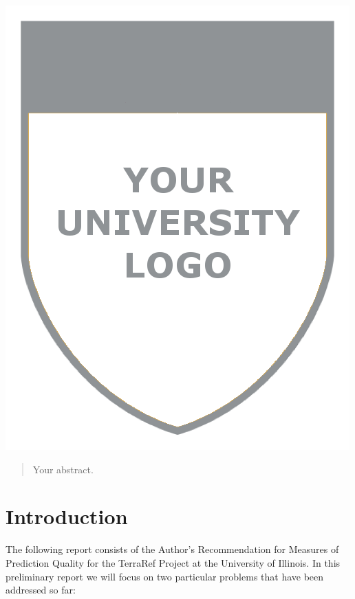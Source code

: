 \begin{titlepage}
\includegraphics{logo.png}\\[1cm] %
 

\vfill %

\end{titlepage}


\begin{abstract}
Your abstract.
\end{abstract}

\section{Introduction}

The following report consists of the Author's Recommendation for Measures of Prediction Quality for the TerraRef Project at the University of Illinois. In this 
preliminary report we will focus on two particular problems that have been addressed so far:

